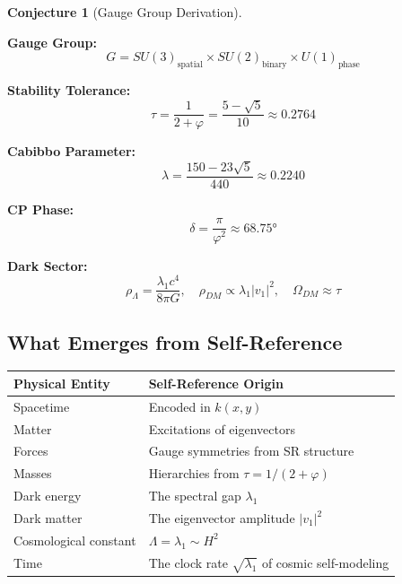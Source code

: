 \documentclass[11pt,a4paper]{article}
\theoremstyle{plain}
\theoremstyle{definition}
\newtheorem{conjecture}[theorem]{Conjecture}
\theoremstyle{remark}
\begin{document}
\begin{conjecture}[Gauge Group Derivation]
\begin{keyresult}
\textbf{Gauge Group:}
\begin{equation}
G = SU(3)_{\text{spatial}} \times SU(2)_{\text{binary}} \times U(1)_{\text{phase}}
\end{equation}

\textbf{Stability Tolerance:}
\begin{equation}
\tau = \frac{1}{2+\varphi} = \frac{5-\sqrt{5}}{10} \approx 0.2764
\end{equation}

\textbf{Cabibbo Parameter:}
\begin{equation}
\lambda = \frac{150 - 23\sqrt{5}}{440} \approx 0.2240
\end{equation}

\textbf{CP Phase:}
\begin{equation}
\delta = \frac{\pi}{\varphi^2} \approx 68.75°
\end{equation}

\textbf{Dark Sector:}
\begin{equation}
\rho_\Lambda = \frac{\lambda_1 c^4}{8\pi G}, \quad \rho_{DM} \propto \lambda_1|v_1|^2, \quad \Omega_{DM} \approx \tau
\end{equation}
\end{keyresult}

\subsection{What Emerges from Self-Reference}

\begin{center}
\begin{tabular}{@{}ll@{}}
\textbf{Physical Entity} & \textbf{Self-Reference Origin} \\
\midrule
Spacetime & Encoded in $k(x,y)$ \\
Matter & Excitations of eigenvectors \\
Forces & Gauge symmetries from SR structure \\
Masses & Hierarchies from $\tau = 1/(2+\varphi)$ \\
Dark energy & The spectral gap $\lambda_1$ \\
Dark matter & The eigenvector amplitude $|v_1|^2$ \\
Cosmological constant & $\Lambda = \lambda_1 \sim H^2$ \\
Time & The clock rate $\sqrt{\lambda_1}$ of cosmic self-modeling \\
\end{tabular}
\end{center}


\end{conjecture}
\end{document}
